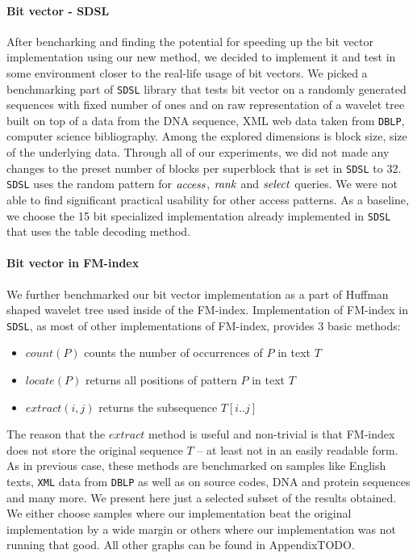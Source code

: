 \paragraph{Bit vector - SDSL}

After bencharking and finding the potential for speeding up the bit vector implementation using
our new method, we decided to implement it and test in some environment closer to the real-life
usage of bit vectors. We picked a benchmarking part of \texttt{SDSL} library that tests bit vector
on a randomly generated sequences with fixed number of ones and on raw representation of a wavelet
tree built on top of a data from the DNA sequence, XML web data taken from \texttt{DBLP}, computer
science bibliography. Among the explored dimensions is block size, size of the underlying data.
Through all of our experiments, we did not made any changes to the preset number of blocks per
superblock that is set in \texttt{SDSL} to 32. \texttt{SDSL} uses the random pattern for $\mathit{access}$,
$\mathit{rank}$ and $\mathit{select}$ queries. We were not able to find significant practical usability for other
access patterns. As a baseline, we choose the 15 bit specialized implementation already implemented
in \texttt{SDSL} that uses the table decoding method.

\paragraph{Bit vector in FM-index}

We further benchmarked our bit vector implementation as a part of Huffman shaped wavelet tree
used inside of the FM-index. Implementation of FM-index in \texttt{SDSL}, as most of other
implementations of FM-index, provides 3 basic methods:

\begin{itemize}
	\item $\mathit{count}(P)$ counts the number of occurrences of $P$ in text $T$
	\item $\mathit{locate}(P)$ returns all positions of pattern $P$ in text $T$
	\item $\mathit{extract}(i, j)$ returns the subsequence $T[i..j]$
\end{itemize}

The reason that the $\mathit{extract}$ method is useful and non-trivial is that FM-index
does not store the original sequence $T$ -- at least not in an easily readable form.
As in previous case, these methods are benchmarked on samples like English texts, \texttt{XML}
data from \texttt{DBLP} as well as on source codes, DNA and protein sequences and many more.
We present here just a selected subset of the results obtained. We either choose samples
where our implementation beat the original implementation by a wide margin or others where
our implementation was not running that good. All other graphs can be found in AppendixTODO.